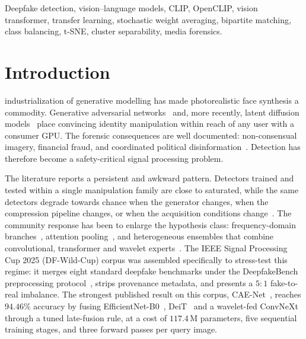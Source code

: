 \documentclass[10pt,journal]{IEEEtran}
\begin{document}
{\begin{IEEEkeywords}
Deepfake detection, vision--language models, CLIP, OpenCLIP, vision
transformer, transfer learning, stochastic weight averaging, bipartite
matching, class balancing, t-SNE, cluster separability, media forensics.
\end{IEEEkeywords}}

\maketitle
\IEEEdisplaynontitleabstractindextext
\IEEEpeerreviewmaketitle

\section{Introduction}
 industrialization of generative modelling has made
photorealistic face synthesis a commodity. Generative adversarial
networks~\cite{goodfellow2014gan,karras2020stylegan2} and, more recently,
latent diffusion models~\cite{rombach2022ldm} place convincing identity
manipulation within reach of any user with a consumer GPU. The forensic
consequences are well documented: non-consensual imagery, financial fraud,
and coordinated political disinformation~\cite{verdoliva2020media,
tolosana2020survey}. Detection has therefore become a safety-critical signal
processing problem.

The literature reports a persistent and awkward pattern. Detectors trained and
tested within a single manipulation family are close to saturated, while the
same detectors degrade towards chance when the generator changes, when the
compression pipeline changes, or when the acquisition conditions
change~\cite{wang2020cnngenerated,corvi2023diffusion}. The community response
has been to enlarge the hypothesis class: frequency-domain
branches~\cite{frank2020frequency,durall2020upconvolution,qian2020f3net},
attention pooling~\cite{zhao2021multiattentional}, and heterogeneous ensembles
that combine convolutional, transformer and wavelet
experts~\cite{bhattacharjee2026caenet,gowda2022ensemble}. The IEEE Signal
Processing Cup 2025 (DF-Wild-Cup) corpus was assembled specifically to
stress-test this regime: it merges eight standard deepfake benchmarks under
the DeepfakeBench preprocessing protocol~\cite{yan2023deepfakebench}, strips
provenance metadata, and presents a $5{:}1$ fake-to-real imbalance. The
strongest published result on this corpus, CAE-Net~\cite{bhattacharjee2026caenet},
reaches $94.46\%$ accuracy by fusing EfficientNet-B0~\cite{tan2019efficientnet},
DeiT~\cite{touvron2021deit} and a wavelet-fed ConvNeXt~\cite{liu2022convnext}
through a tuned late-fusion rule, at a cost of $117.4$\,M parameters, five
sequential training stages, and three forward passes per query image.
\end{document}
